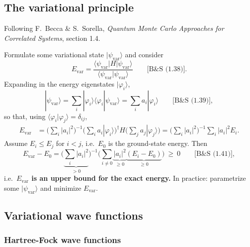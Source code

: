 \documentclass[../../main.tex]{subfiles}
\begin{document}
\subsection{The variational principle}

Following F.\ Becca \& S.\ Sorella, \emph{Quantum Monte Carlo Approaches for
Correlated Systems}, section 1.4.

Formulate some variational state $|\psi_{\mathrm{var}}\rangle$ and consider
\begin{equation}
E_{\mathrm{var}}=\frac{\langle\psi_{\mathrm{var}}|H|\psi_{\mathrm{var}}\rangle}
{\langle\psi_{\mathrm{var}}|\psi_{\mathrm{var}}\rangle}
\qquad\text{[B\&S~(1.38)]}.
\end{equation}
Expanding in the energy eigenstates $|\varphi_i\rangle$,
\begin{equation}
|\psi_{\mathrm{var}}\rangle=\sum_i |\varphi_i\rangle\langle\varphi_i|\psi_{\mathrm{var}}\rangle
=\sum_i a_i|\varphi_i\rangle
\qquad\text{[B\&S~(1.39)]},
\end{equation}
so that, using $\langle\varphi_i|\varphi_j\rangle=\delta_{ij}$,
\begin{align}
E_{\mathrm{var}}&=\Big(\sum_i|a_i|^2\Big)^{-1}
\Big(\sum_i a_i|\varphi_i\rangle\Big)^{\dagger} H
\Big(\sum_j a_j|\varphi_j\rangle\Big)
=\Big(\sum_i|a_i|^2\Big)^{-1}\sum_i |a_i|^2 E_i .
\end{align}
Assume $E_i\le E_j$ for $i<j$, i.e.\ $E_0$ is the ground-state energy. Then
\begin{equation}
E_{\mathrm{var}}-E_0=\Big(\underbrace{\sum_i|a_i|^2}_{>0}\Big)^{-1}
\Big(\sum_{i\neq0}\underbrace{|a_i|^2}_{\ge0}
\underbrace{(E_i-E_0)}_{\ge0}\Big)\ \ge\ 0
\qquad\text{[B\&S~(1.41)]},
\end{equation}
i.e.\ \textbf{$E_{\mathrm{var}}$ is an upper bound for the exact energy.} In
practice: parametrize some $|\psi_{\mathrm{var}}\rangle$ and minimize
$E_{\mathrm{var}}$.

\subsection{Variational wave functions}

\subsubsection{Hartree-Fock wave functions}
\end{document}
